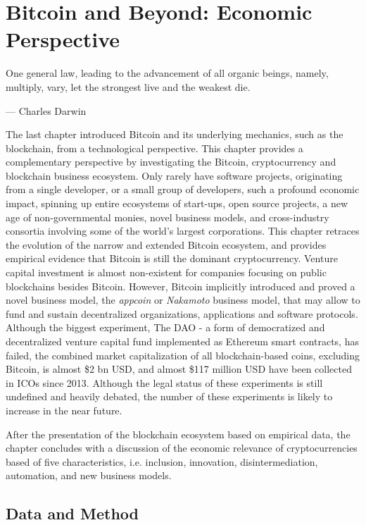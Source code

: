 \chapter{Bitcoin and Beyond: Economic Perspective}
\label{sec:ecoystem}

\epigraph{One general law, leading to the advancement of all organic beings, namely, multiply, vary, let the strongest live and the weakest die.}{--- \textup{Charles Darwin}}


The last chapter introduced Bitcoin and its underlying mechanics, such as the blockchain, from a technological perspective. This chapter provides a complementary perspective by investigating the Bitcoin, cryptocurrency and blockchain business ecosystem. Only rarely have software projects, originating from a single developer, or a small group of developers, such a profound economic impact, spinning up entire ecosystems of start-ups, open source projects, a new age of non-governmental monies, novel business models, and cross-industry consortia involving some of the world's largest corporations. This chapter retraces the evolution of the narrow and extended Bitcoin ecosystem, and provides empirical evidence that Bitcoin is still the dominant cryptocurrency.
Venture capital investment is almost non-existent for companies focusing on public blockchains besides Bitcoin. However, Bitcoin implicitly introduced and proved a novel business model, the \emph{appcoin} or \emph{Nakamoto} business model, that may allow to fund and sustain decentralized organizations, applications and software protocols. Although the biggest experiment, The DAO - a form of democratized and decentralized venture capital fund implemented as Ethereum smart contracts, has failed, the combined market capitalization of all blockchain-based coins, excluding Bitcoin, is almost \$2 bn USD, and almost \$117 million USD have been collected in \ac{ICO}s since 2013. Although the legal status of these experiments is still undefined and heavily debated, the number of these experiments is likely to increase in the near future. 

After the presentation of the blockchain ecosystem based on empirical data, the chapter concludes with a discussion of the economic relevance of cryptocurrencies based of five characteristics, i.e. inclusion, innovation, disintermediation, automation, and new business models.

\section{Data and Method}

